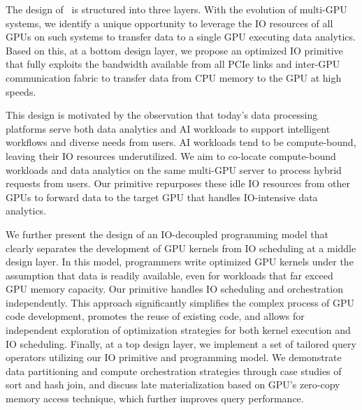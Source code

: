 The design of \THISWORK\ is structured into three layers. 
With the evolution of multi-GPU systems, we identify a unique opportunity to leverage the IO resources of all GPUs on such systems to transfer data to a single GPU executing data analytics. 
Based on this, at a bottom design layer, we propose an optimized IO primitive that fully exploits the bandwidth available from all PCIe links and inter-GPU communication fabric to transfer data from CPU memory to the GPU at high speeds. 
{\color{black}
This design is motivated by the observation that today's data processing platforms serve both data analytics and AI workloads to support intelligent workflows and diverse needs from users. 
AI workloads tend to be compute-bound, leaving their IO resources underutilized. 
We aim to co-locate compute-bound workloads and data analytics on the same multi-GPU server to process hybrid requests from users.
Our primitive repurposes these idle IO resources from other GPUs to forward data to the target GPU that handles IO-intensive data analytics.


}

We further present the design of an IO-decoupled programming model that clearly separates the development of GPU kernels from IO scheduling at a middle design layer.
In this model, programmers write optimized GPU kernels under the assumption that data is readily available, even for workloads that far exceed GPU memory capacity. 
Our primitive handles IO scheduling and orchestration independently.
This approach significantly simplifies the complex process of GPU code development, promotes the reuse of existing code, and allows for independent exploration of optimization strategies for both kernel execution and IO scheduling. 
Finally, at a top design layer, we implement a set of tailored query operators utilizing our IO primitive and programming model. 
We demonstrate data partitioning and compute orchestration strategies through case studies of sort and hash join, and discuss late materialization based on GPU's zero-copy memory access technique, which further improves query performance.

